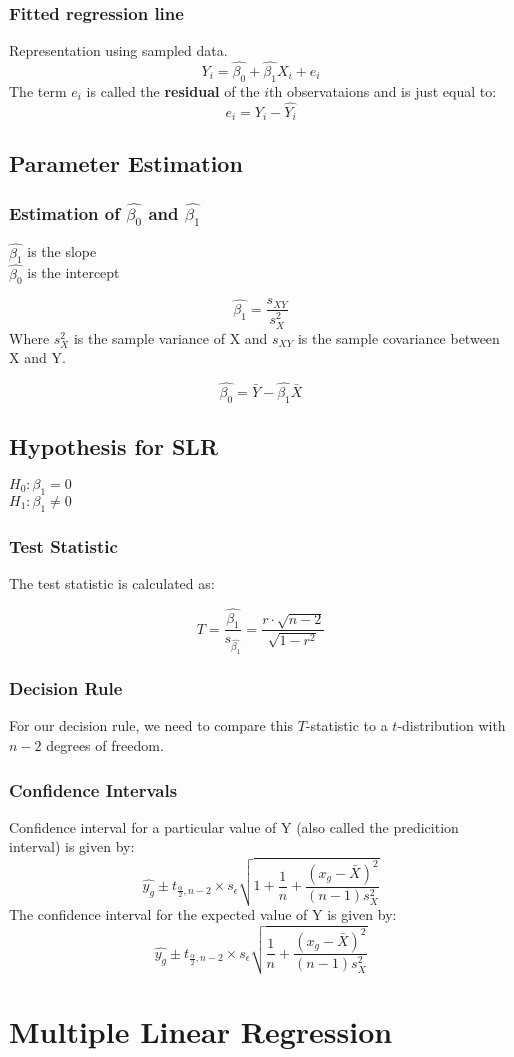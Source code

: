 \documentclass{article}
\begin{document}
\subsubsection{Fitted regression line}
Representation using sampled data.
$$
Y_i = \hat{\beta_0} + \hat{\beta_1} X_i + e_i
$$
The term $e_i$ is called the \textbf{residual} of the $i$th observataions and is just equal to:
$$
e_i = Y_i - \hat{Y_i}
$$

\subsection{Parameter Estimation}

\subsubsection{Estimation of $\hat{\beta_0}$ and $\hat{\beta_1}$}

$\hat{\beta_1}$ is the slope\\
$\hat{\beta_0}$ is the intercept 

$$
\hat{\beta_1} = \frac{s_{XY}}{s^2_X}
$$
Where $s^2_X$ is the sample variance of X and $s_{XY}$ is the sample covariance between X and Y.

$$
\hat{\beta_0} = \bar{Y} - \hat{\beta_1} \bar{X}
$$

\subsection{Hypothesis for SLR}

$H_0 : \beta_1 = 0$
\\

$H_1 : \beta_1 \neq 0$

\subsubsection{Test Statistic}
The test statistic is calculated as:

$$
T = \frac{\hat{\beta_1}}{s_{\hat{\beta_1}}} = \frac{r \cdot \sqrt{n-2}}{\sqrt{1 - r^2}}
$$

\subsubsection{Decision Rule}

For our decision rule, we need to compare this $T$-statistic to a $t$-distribution with $n - 2$ degrees of freedom.

\subsubsection{Confidence Intervals}
Confidence interval for a particular value of Y (also called the predicition interval) is given by:
$$
\hat{y_g} \pm t_{\frac{\alpha}{2}, n-2} \times s_\epsilon 
\sqrt{1 + \frac{1}{n} + \frac{(x_g - \bar{X})^2}{(n - 1)s^2_X}}
$$
The confidence interval for the expected value of Y is given by:
$$
\hat{y_g} \pm t_{\frac{\alpha}{2}, n-2} \times s_\epsilon 
\sqrt{\frac{1}{n} + \frac{(x_g - \bar{X})^2}{(n - 1)s^2_X}}
$$


\section{Multiple Linear Regression}
\end{document}
